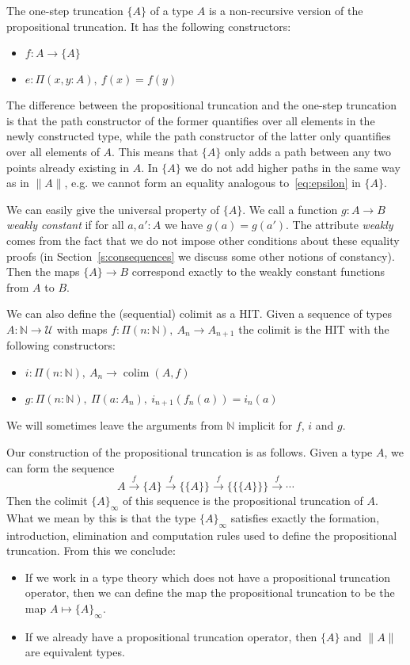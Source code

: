 \documentclass[square]{sigplanconf}
\newcommand{\fa}[2]{\ensuremath{\Pi(#1),\ #2}}
\DeclareMathOperator{\colim}{colim}
\newcommand{\N}{\mathbb{N}}
\newcommand{\U}{\mathcal{U}}
\theoremstyle{definition}
\theoremstyle{remark}
\begin{document}
The one-step truncation $\{A\}$ of a type $A$ is a non-recursive version of the propositional
truncation. It has the following constructors:
\begin{itemize}
  \item $f : A \to \{A\}$
  \item $e : \fa{x, y : A}{f(x) = f(y)}$
\end{itemize}
The difference between the propositional truncation and the one-step truncation is that the path
constructor of the former quantifies over all elements in the newly constructed type, while the path
constructor of the latter only quantifies over all elements of $A$. This means that $\{A\}$ only
adds a path between any two points already existing in $A$. In $\{A\}$ we do not add higher paths in
the same way as in $\|A\|$, e.g. we cannot form an equality analogous to~\eqref{eq:epsilon} in
$\{A\}$.

We can easily give the universal property of $\{A\}$. We call a function $g : A \to B$ \emph{weakly
  constant} if for all $a,a' : A$ we have $g(a) = g(a')$. The attribute \emph{weakly} comes from the
fact that we do not impose other conditions about these equality proofs (in
Section~\ref{s:consequences} we discuss some other notions of constancy). Then the maps $\{A\}\to B$
correspond exactly to the weakly constant functions from $A$ to $B$.

We can also define the (sequential) colimit as a HIT. Given a sequence of types $A : \N\to\U$ with
maps $f:\fa{n:\N}{A_n\to A_{n+1}}$ the colimit is the HIT with the following constructors:
\begin{itemize}
  \item $i : \fa{n:\N}{A_n \to \colim(A,f)}$
  \item $g : \fa{n:\N}{\fa{a:A_n}{i_{n+1}(f_n(a))=i_n(a)}}$
\end{itemize}
We will sometimes leave the arguments from $\N$ implicit for $f$, $i$ and $g$.

Our construction of the propositional truncation is as follows. Given a type $A$, we can form the
sequence
\begin{equation}
A\stackrel{f}{\to}\{A\}\stackrel{f}{\to}\{\{A\}\}\stackrel{f}{\to}\{\{\{A\}\}\}\stackrel{f}{\to}
\cdots \label{eq:sequence}
\end{equation}
Then the colimit $\{A\}_\infty$ of this sequence is the propositional truncation of $A$. What we
mean by this is that the type $\{A\}_\infty$ satisfies exactly the formation, introduction,
elimination and computation rules used to define the propositional truncation. From this we
conclude:
\begin{itemize}
\item If we work in a type theory which does not have a propositional truncation operator, then we
  can define the map the propositional truncation to be the map $A\mapsto \{A\}_\infty$.
\item If we already have a propositional truncation operator, then $\{A\}$ and $\|A\|$ are
  equivalent types.
\end{itemize}
\end{document}

